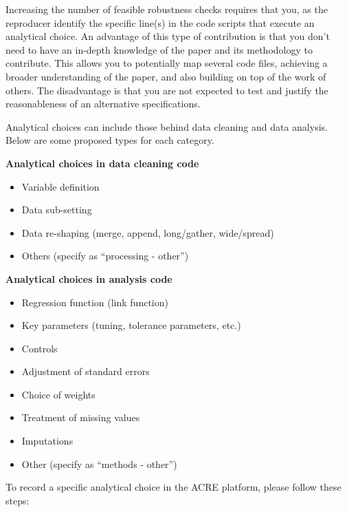 \documentclass[
]{book}
\providecommand{\tightlist}{%
  \setlength{\itemsep}{0pt}\setlength{\parskip}{0pt}}
\begin{document}
Increasing the number of feasible robustness checks requires that you, as the reproducer identify the specific line(s) in the code scripts that execute an analytical choice. An advantage of this type of contribution is that you don't need to have an in-depth knowledge of the paper and its methodology to contribute. This allows you to potentially map several code files, achieving a broader understanding of the paper, and also building on top of the work of others. The disadvantage is that you are not expected to test and justify the reasonableness of an alternative specifications.

Analytical choices can include those behind data cleaning and data analysis. Below are some proposed types for each category.

\textbf{Analytical choices in data cleaning code}

\begin{itemize}
\tightlist
\item
  Variable definition
\item
  Data sub-setting
\item
  Data re-shaping (merge, append, long/gather, wide/spread)
\item
  Others (specify as ``processing - other'')
\end{itemize}

\textbf{Analytical choices in analysis code}

\begin{itemize}
\tightlist
\item
  Regression function (link function)
\item
  Key parameters (tuning, tolerance parameters, etc.)
\item
  Controls
\item
  Adjustment of standard errors
\item
  Choice of weights
\item
  Treatment of missing values
\item
  Imputations
\item
  Other (specify as ``methods - other'')
\end{itemize}

To record a specific analytical choice in the ACRE platform, please follow these steps:
\end{document}
